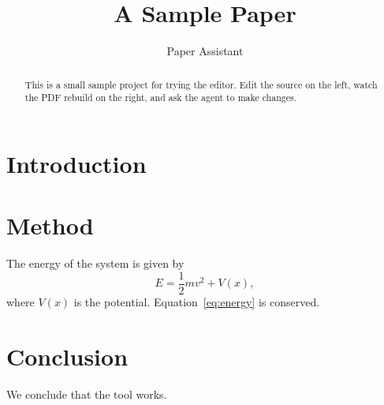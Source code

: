 \documentclass[11pt]{article}
\title{A Sample Paper}
\author{Paper Assistant}
\date{}
\begin{document}
\maketitle

\begin{abstract}
This is a small sample project for trying the editor. Edit the source on the
left, watch the PDF rebuild on the right, and ask the agent to make changes.
\end{abstract}

\section{Introduction}


\section{Method}
The energy of the system is given by
\begin{equation}
  E = \frac{1}{2} m v^2 + V(x),
  \label{eq:energy}
\end{equation}
where $V(x)$ is the potential. Equation~\eqref{eq:energy} is conserved.

\section{Conclusion}
We conclude that the tool works.



\end{document}
